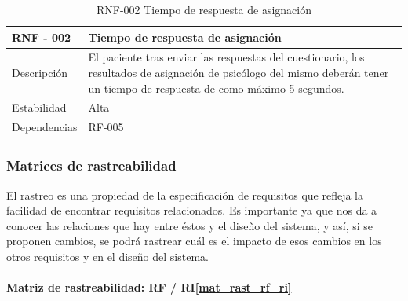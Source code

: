 \begin{table}[htpb]
\centering
\begin{tabularx}{\textwidth}{|l|X|}
\hline
RNF - 002                               & Tiempo de respuesta de asignación                                                                                                                                            \\ \hline
Descripción                             & El paciente tras enviar las respuestas del cuestionario, los resultados de asignación de psicólogo del mismo deberán tener un tiempo de respuesta de como máximo 5 segundos. \\ \hline
Estabilidad                             & Alta                                                                                                                                                                         \\ \hline
Dependencias & RF-005                                                                                                                                                                       \\ \hline
\end{tabularx}
\caption{RNF-002 Tiempo de respuesta de asignación}                                                                                                                                                                                                                                                                      
\end{table}


\subsubsection{Matrices de rastreabilidad}

El rastreo es una propiedad de la especificación de requisitos que refleja la facilidad de encontrar requisitos relacionados. Es importante ya que nos da a conocer las relaciones que hay entre éstos y el diseño del sistema, y así, si se proponen cambios, se podrá rastrear cuál es el impacto de esos cambios en los otros requisitos y en el diseño del sistema.


\paragraph{Matriz de rastreabilidad: RF / RI\ref{mat_rast_rf_ri}}


